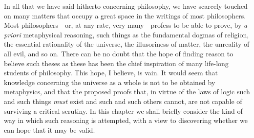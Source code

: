 \documentclass[oneside,letterpaper,12pt]{book}
\begin{document}
In all that we have said hitherto concerning philosophy, we have
scarcely touched on many matters that occupy a great space in the
writings of most philosophers. Most philosophers---or, at any rate, very
many---profess to be able to prove, by \emph{a priori} metaphysical
reasoning, such things as the fundamental dogmas of religion, the
essential rationality of the universe, the illusoriness of matter, the
unreality of all evil, and so on. There can be no doubt that the hope of
finding reason to believe such theses as these has been the chief
inspiration of many life-long students of philosophy. This hope, I
believe, is vain. \label{vain} It would seem that knowledge concerning the universe
as a whole is not to be obtained by metaphysics, and that the proposed
proofs that, in virtue of the laws of logic such and such things
\emph{must} exist and such and such others cannot, are not capable of
surviving a critical scrutiny. In this chapter we shall briefly consider
the kind of way in which such reasoning is attempted, with a view to
discovering whether we can hope that it may be valid.
\end{document}
